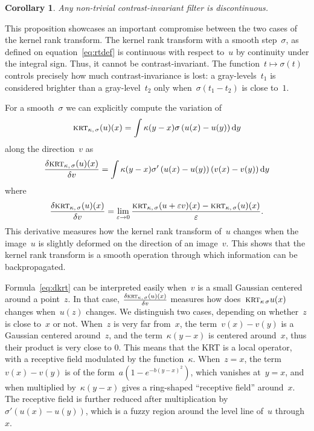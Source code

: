 \documentclass[12pt]{article}                  %
\newtheorem{corollary}{Corollary}
\def\parens#1{\left(#1\right)}
\begin{document}
\begin{corollary}
	Any non-trivial contrast-invariant filter is discontinuous.
\end{corollary}

This proposition showcases an important compromise between the two cases of
the kernel rank transform.
The kernel rank transform with a smooth step~$\sigma$, as defined on
equation~\ref{eq:rtdef} is continuous with respect to~$u$ by continuity
under the integral sign.  Thus, it cannot be contrast-invariant.  The
function~$t\mapsto\sigma(t)$ controls precisely how much contrast-invariance
is lost: a gray-levels~$t_1$ is considered brighter than a gray-level~$t_2$
only when~$\sigma(t_1-t_2)$ is close to~$1$.

For a smooth~$\sigma$ we can explicitly compute the variation of
\begin{equation}
	\textsc{krt}_{\kappa,\,\sigma}(u)(x) = \int\kappa(y-x)\sigma\parens{u(x)-u(y)}\mathrm{d}y
\end{equation}
along the direction~$v$ as
\begin{equation}\label{eq:dkrt}
	\frac{\delta \textsc{krt}_{\kappa,\,\sigma}(u)(x)}{\delta v}
	= \int\kappa(y-x)\sigma'\parens{u(x)-u(y)}\parens{v(x)-v(y)}\mathrm{d}y
\end{equation}
where
\begin{equation}
	\frac{\delta \textsc{krt}_{\kappa,\,\sigma}(u)(x)}{\delta v}
	=
	\lim_{\varepsilon\to0}
	\frac{\textsc{krt}_{\kappa,\,\sigma}(u+\varepsilon v)(x)
	-\textsc{krt}_{\kappa,\,\sigma}(u)(x)}{\varepsilon}.
\end{equation}
This derivative measures how the kernel rank transform of~$u$ changes
when the image~$u$ is slightly deformed on the direction of an image~$v$.
This shows that the kernel rank transform is a smooth operation through
which information can be backpropagated.

Formula~\ref{eq:dkrt} can be interpreted easily when~$v$ is a small Gaussian
centered around a point~$z$.  In that case, $\frac{\delta
\textsc{krt}_{\kappa,\,\sigma}(u)(x)}{\delta v}$ measures how
does~$\textsc{krt}_{\kappa\,\sigma}u(x)$ changes when~$u(z)$ changes.
We distinguish two cases, depending on whether~$z$ is close to~$x$ or not.
When~$z$ is very far from~$x$, the term~$v(x)-v(y)$ is a Gaussian centered
around~$z$, and the term~$\kappa(y-x)$ is centered around~$x$, thus their
product is very close to 0.  This means that the KRT is a local operator,
with a receptive field modulated by the function~$\kappa$.  When~$z=x$, the
term~$v(x)-v(y)$ is of the form~$a(1-e^{-b(y-x)^2})$, which vanishes
at~$y=x$, and when multiplied by~$\kappa(y-x)$ gives a ring-shaped ``receptive
field'' around~$x$.  The receptive field is further reduced after
multiplication by~$\sigma'\parens{u(x)-u(y)}$, which is a fuzzy region
around the level line of~$u$ through~$x$.
\end{document}

